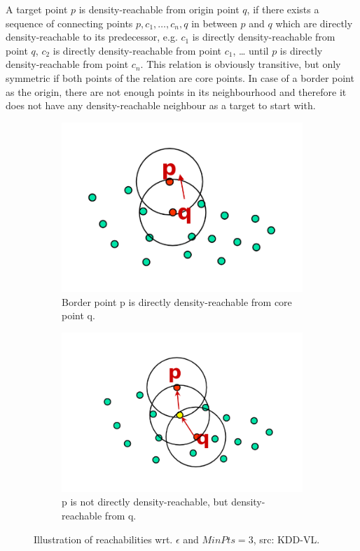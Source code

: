 A target point $p$ is density-reachable from origin point $q$, if there exists a sequence of connecting points $p, c_1, \dotsc, c_n, q$ in between $p$ and $q$ which are directly density-reachable to its predecessor, e.g. $c_1$ is directly density-reachable from point $q$, $c_2$ is directly density-reachable from point $c_1$, \dots{} until $p$ is directly density-reachable from point $c_n$. This relation is obviously transitive, but only symmetric if both points of the relation are core points. In case of a border point as the origin, there are not enough points in its neighbourhood and therefore it does not have any density-reachable neighbour as a target to start with.

\begin{figure}
    \centering
    \begin{subfigure}[t]{.5\textwidth}
      \centering  
      \captionsetup{width=.9\linewidth}
      \includegraphics[width=.8\textwidth]{figures/directlydensityreachable.png}
      \caption{Border point p is directly density-reachable from core point q.}
      \label{fig:directdensityreachable}
    \end{subfigure}%
    \begin{subfigure}[t]{.5\textwidth}
      \centering
      \captionsetup{width=.9\linewidth}
      \includegraphics[width=.8\textwidth]{figures/density-reachable.png}
      \caption{p is not directly density-reachable, but density-reachable from q.}
      \label{fig:densityreachable}
    \end{subfigure}
    \caption{Illustration of reachabilities wrt. $\epsilon$ and $MinPts = 3$, src: KDD-VL.}
\end{figure}

